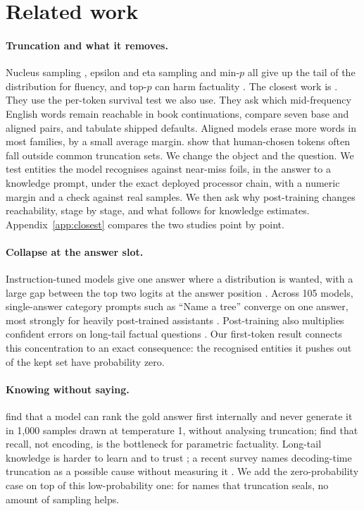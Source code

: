 \documentclass[11pt]{article}
\begin{document}
\section{Related work}

\paragraph{Truncation and what it removes.} Nucleus sampling \citep{holtzman2020curious}, epsilon and eta sampling \citep{hewitt2022truncation} and min-$p$ \citep{nguyen2025minp} all give up the tail of the distribution for fluency, and top-$p$ can harm factuality \citep{lee2022factuality}. The closest work is \citet{awad2026lost}. They use the per-token survival test we also use. They ask which mid-frequency English words remain reachable in book continuations, compare seven base and aligned pairs, and tabulate shipped defaults. Aligned models erase more words in most families, by a small average margin. \citet{garcesarias2026truncation} show that human-chosen tokens often fall outside common truncation sets. We change the object and the question. We test entities the model recognises against near-miss foils, in the answer to a knowledge prompt, under the exact deployed processor chain, with a numeric margin and a check against real samples. We then ask why post-training changes reachability, stage by stage, and what follows for knowledge estimates. Appendix~\ref{app:closest} compares the two studies point by point.

\paragraph{Collapse at the answer slot.} Instruction-tuned models give one answer where a distribution is wanted, with a large gap between the top two logits at the answer position \citep{jang2026instruction}. Across 105 models, single-answer category prompts such as ``Name a tree'' converge on one answer, most strongly for heavily post-trained assistants \citep{parikh2026census}. Post-training also multiplies confident errors on long-tail factual questions \citep{huang2026alignment}. Our first-token result connects this concentration to an exact consequence: the recognised entities it pushes out of the kept set have probability zero.

\paragraph{Knowing without saying.} \citet{gekhman2025insideout} find that a model can rank the gold answer first internally and never generate it in 1{,}000 samples drawn at temperature 1, without analysing truncation; \citet{calderon2026empty} find that recall, not encoding, is the bottleneck for parametric factuality. Long-tail knowledge is harder to learn \citep{kandpal2023longtail} and to trust \citep{mallen2023trust}; a recent survey names decoding-time truncation as a possible cause without measuring it \citep{badhe2026longtail}. We add the zero-probability case on top of this low-probability one: for names that truncation seals, no amount of sampling helps.
\end{document}
